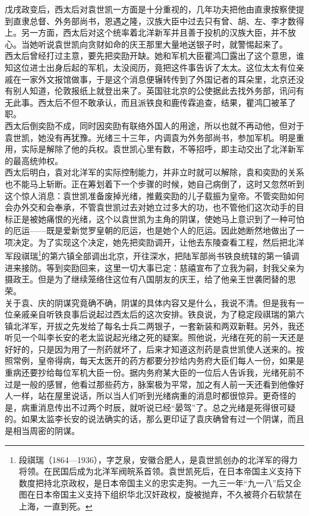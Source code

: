 戊戌政变后，西太后对袁世凯一方面是十分重视的，几年功夫把他由直隶按察使提到直隶总督、外务部尚书，恩遇之隆，汉族大臣中过去只有曾、胡、左、李才数得上。另一方面，西太后对这个统率着北洋新军并且善于投机的汉族大臣，并不放心。当她听说袁世凯向贪财如命的庆王那里大量地送银子时，就警惕起来了。\\

西太后曾经打过主意，要先把奕劻开缺。她和军机大臣瞿鸿囗露出了这个意思，谁知这位进士出身后起的军机，太没阅历，竟把这件事告诉了太太。这位太太有位亲戚在一家外文报馆做事，于是这个消息便辗转传到了外国记者的耳朵里，北京还没有别人知道，伦敦报纸上就登出来了。英国驻北京的公使据此去找外务部，讯问有无此事。西太后不但不敢承认，而且派铁良和鹿传霖追查，结果，瞿鸿囗被革了职。\\

西太后倒奕劻不成，同时因奕劻有联络外国人的用途，所以也就不再动他，但对于袁世凯，她没有再犹豫。光绪三十三年，内调袁为外务部尚书，参加军机。明是重用，实际是解除了他的兵权。袁世凯心里有数，不等招呼，即主动交出了北洋新军的最高统帅权。\\

西太后明白，袁对北洋军的实际控制能力，并非立时就可以解除，袁和奕劻的关系也不能马上斩断。正在筹划着下一个步骤的时候，她自己病倒了，这时又忽然听到这个惊人消息：袁世凯准备废掉光绪，推戴奕劻的儿子载振为皇帝。不管奕劻如何会办外交和会奉承，不管袁世凯过去对她立过多大的功，也不管他们这次动手的目标正是被她痛恨的光绪，这个以袁世凯为主角的阴谋，使她马上意识到了一种可怕的厄运——既是爱新觉罗皇朝的厄运，也是她个人的厄运。因此她断然地做出了一项决定。为了实现这个决定，她先把奕劻调开，让他去东陵查看工程，然后把北洋军段祺瑞\footnote{段祺瑞（1864—1936），字芝泉，安徽合肥人，是袁世凯创办的北洋军的得力将领。在民国后成为北洋军阀皖系首领。袁世凯死后，在日本帝国主义支持下数度把持北京政权，是日本帝国主义的忠实走狗。一九三一年“九一八”后又企图在日本帝国主义支持下组织华北汉奸政权，旋被抛弃，不久被蒋介石软禁在上海，一直到死。}的第六镇全部调出北京，开往深水，把陆军部尚书铁良统辖的第一镇调进来接防。等到奕劻回来，这里一切大事已定：慈禧宣布了立我为嗣，封我父亲为摄政王。但是为了继续笼络住这位有八国朋友的庆王，给了他亲王世袭罔替的思荣。\\

关于袁、庆的阴谋究竟确不确，阴谋的具体内容又是什么，我说不清。但是我有一位亲戚亲自听铁良事后说起过西太后的这次安排。铁良说，为了稳定段祺瑞的第六镇北洋军，开拔之先发给了每名士兵二两银子，一套新装和两双新鞋。另外，我还听见一个叫李长安的老太监说起光绪之死的疑案。照他说，光绪在死的前一天还是好好的，只是因为用了一剂药就坏了，后来才知道这剂药是袁世凯使人送来的。按照常例，皇帝得病，每天太医开的药方都要分抄给内务府大臣们每人一份，如果是重病还要抄给每位军机大臣一份。据内务府某大臣的一位后人告诉我，光绪死前不过是一般的感冒，他看过那些药方，脉案极为平常，加之有人前一天还看到他像好人一样，站在屋里说话，所以当人们听到光绪病重的消息时都很惊异。更奇怪的是，病重消息传出不过两个时辰，就听说已经“晏驾”了。总之光绪是死得很可疑的。如果太监李长安的说法确实的话，那么更印证了袁庆确曾有过一个阴谋，而且是相当周密的阴谋。\\

